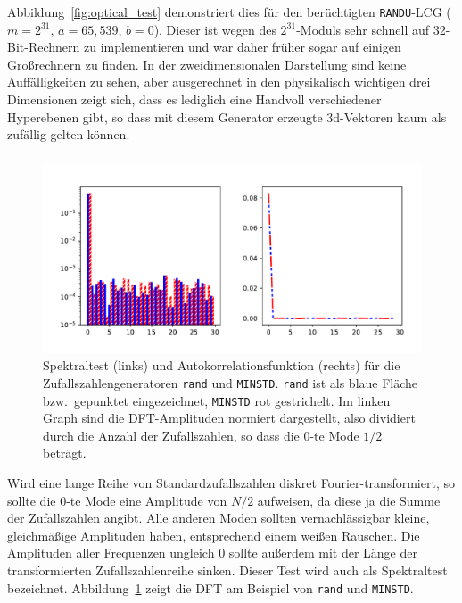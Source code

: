 Abbildung~\ref{fig:optical_test} demonstriert dies für den
berüchtigten \texttt{RANDU}-LCG ($m=2^{31}$, $a=65,539$,
$b=0$). Dieser ist wegen des $2^{31}$-Moduls sehr schnell auf
32-Bit-Rechnern zu implementieren und war daher früher sogar auf
einigen Großrechnern zu finden. In der zweidimensionalen Darstellung
sind keine Auffälligkeiten zu sehen, aber ausgerechnet in den
physikalisch wichtigen drei Dimensionen zeigt sich, dass es lediglich
eine Handvoll verschiedener Hyperebenen gibt, so dass mit diesem
Generator erzeugte 3d-Vektoren kaum als zufällig gelten können.

\subsubsection{}

\begin{figure}
  \centering
  \includegraphics[width=\textwidth]{plots/fft_tests}
  \caption{Spektraltest (links) und Autokorrelationsfunktion (rechts)
    für die Zufallszahlengeneratoren \texttt{rand} und
    \texttt{MINSTD}. \texttt{rand} ist als blaue Fläche bzw.\ gepunktet
    eingezeichnet, \texttt{MINSTD} rot gestrichelt.  Im linken Graph
    sind die DFT-Amplituden normiert dargestellt, also dividiert durch
    die Anzahl der Zufallszahlen, so dass die 0-te Mode $1/2$ beträgt.}
  \label{fig:fft_tests}
\end{figure}

Wird eine lange Reihe von Standardzufallszahlen diskret
Fourier-transformiert, so sollte die 0-te Mode eine Amplitude von
$N/2$ aufweisen, da diese ja die Summe der Zufallszahlen angibt. Alle
anderen Moden sollten vernachlässigbar kleine, gleichmäßige
Amplituden haben, entsprechend einem weißen Rauschen. Die Amplituden
aller Frequenzen ungleich $0$ sollte außerdem mit der Länge der
transformierten Zufallszahlenreihe sinken. Dieser Test wird auch als
Spektraltest bezeichnet. Abbildung~\ref{fig:fft_tests} zeigt die
DFT am Beispiel von \texttt{rand} und \texttt{MINSTD}.

